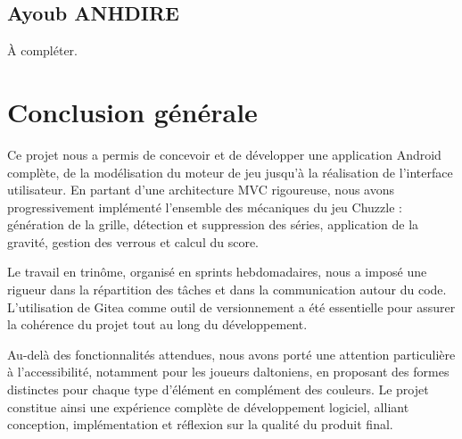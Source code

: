 \documentclass[a4paper,12pt]{article}
\begin{document}
\subsection{Ayoub ANHDIRE}

À compléter.

\section*{Conclusion générale}

Ce projet nous a permis de concevoir et de développer une application Android complète,
de la modélisation du moteur de jeu jusqu'à la réalisation de l'interface utilisateur.
En partant d'une architecture MVC rigoureuse, nous avons progressivement implémenté
l'ensemble des mécaniques du jeu Chuzzle : génération de la grille, détection et
suppression des séries, application de la gravité, gestion des verrous et calcul du score.

Le travail en trinôme, organisé en sprints hebdomadaires, nous a imposé une rigueur
dans la répartition des tâches et dans la communication autour du code. L'utilisation
de Gitea comme outil de versionnement a été essentielle pour assurer la cohérence du
projet tout au long du développement.

Au-delà des fonctionnalités attendues, nous avons porté une attention particulière à
l'accessibilité, notamment pour les joueurs daltoniens, en proposant des formes
distinctes pour chaque type d'élément en complément des couleurs. Le projet constitue
ainsi une expérience complète de développement logiciel, alliant conception,
implémentation et réflexion sur la qualité du produit final.
\end{document}
